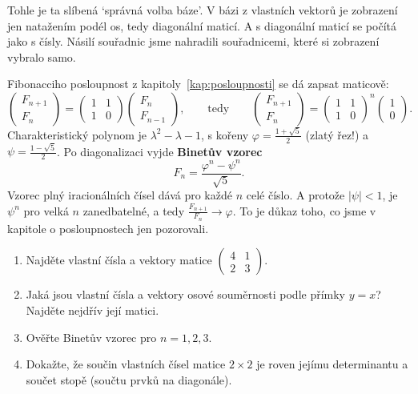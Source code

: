 Tohle je ta slíbená `správná volba báze'. V bázi z vlastních vektorů je zobrazení jen natažením podél os, tedy diagonální maticí. A s diagonální maticí se počítá jako s čísly. Násilí souřadnic jsme nahradili souřadnicemi, které si zobrazení vybralo samo.

\begin{example}\label{ex:binet}
  Fibonacciho posloupnost z kapitoly~\ref{kap:posloupnosti} se dá zapsat maticově:
  \begin{equation*}
    \begin{pmatrix} F_{n+1}\\ F_n\end{pmatrix} = \begin{pmatrix} 1 & 1\\ 1 & 0\end{pmatrix}\begin{pmatrix} F_n\\ F_{n-1}\end{pmatrix},\qquad\text{tedy}\qquad\begin{pmatrix} F_{n+1}\\ F_n\end{pmatrix} = {\begin{pmatrix} 1 & 1\\ 1 & 0\end{pmatrix}}^n\begin{pmatrix} 1\\ 0\end{pmatrix}.
  \end{equation*}
  Charakteristický polynom je $\lambda^2 - \lambda - 1$, s kořeny $\varphi = \frac{1 + \sqrt{5}}{2}$ (zlatý řez!) a $\psi = \frac{1 - \sqrt{5}}{2}$. Po diagonalizaci vyjde \textbf{Binetův vzorec}
  \begin{equation*}
    F_n = \frac{\varphi^n - \psi^n}{\sqrt{5}}.
  \end{equation*}
  Vzorec plný iracionálních čísel dává pro každé $n$ celé číslo. A protože $|\psi| < 1$, je $\psi^n$ pro velká $n$ zanedbatelné, a tedy $\frac{F_{n+1}}{F_n}\to\varphi$. To je důkaz toho, co jsme v kapitole o posloupnostech jen pozorovali.
\end{example}

\begin{problem}
  \begin{enumerate}[label=(\alph*)]
    \item Najděte vlastní čísla a vektory matice $\begin{pmatrix} 4 & 1\\ 2 & 3\end{pmatrix}$.
    \item Jaká jsou vlastní čísla a vektory osové souměrnosti podle přímky $y = x$? Najděte nejdřív její matici.
    \item Ověřte Binetův vzorec pro $n = 1, 2, 3$.
    \item Dokažte, že součin vlastních čísel matice $2\times 2$ je roven jejímu determinantu a součet stopě (součtu prvků na diagonále).
  \end{enumerate}
\end{problem}

